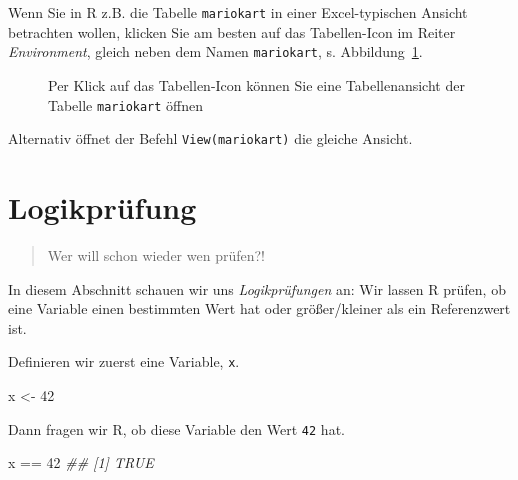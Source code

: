 \documentclass[
  a4paper,
  DIV=11]{scrreprt}
\newenvironment{Shaded}{\begin{snugshade}}{\end{snugshade}}
\newcommand{\DecValTok}[1]{\textcolor[rgb]{0.68,0.00,0.00}{#1}}
\newcommand{\DocumentationTok}[1]{\textcolor[rgb]{0.37,0.37,0.37}{\textit{#1}}}
\newcommand{\NormalTok}[1]{\textcolor[rgb]{0.00,0.23,0.31}{#1}}
\newcommand{\OtherTok}[1]{\textcolor[rgb]{0.00,0.23,0.31}{#1}}
\newcommand{\SpecialCharTok}[1]{\textcolor[rgb]{0.37,0.37,0.37}{#1}}
\theoremstyle{definition}
\theoremstyle{definition}
\theoremstyle{definition}
\theoremstyle{remark}
\begin{document}
Wenn Sie in R z.B. die Tabelle \texttt{mariokart} in einer
Excel-typischen Ansicht betrachten wollen, klicken Sie am besten auf das
Tabellen-Icon im Reiter \emph{Environment}, gleich neben dem Namen
\texttt{mariokart}, s. Abbildung~\ref{fig-view-mariokart}.

\begin{figure}


\caption{\label{fig-view-mariokart}Per Klick auf das Tabellen-Icon
können Sie eine Tabellenansicht der Tabelle \texttt{mariokart} öffnen}

\end{figure}%

Alternativ öffnet der Befehl \texttt{View(mariokart)} die gleiche
Ansicht.

\section{Logikprüfung}\label{sec-logic}

\begin{quote}
{} Wer will schon wieder wen prüfen?!
\end{quote}

In diesem Abschnitt schauen wir uns \emph{Logikprüfungen} an: Wir lassen
R prüfen, ob eine Variable einen bestimmten Wert hat oder größer/kleiner
als ein Referenzwert ist.

Definieren wir zuerst eine Variable, \texttt{x}.

\begin{Shaded}
\begin{Highlighting}[]
\NormalTok{x }\OtherTok{\textless{}{-}} \DecValTok{42}
\end{Highlighting}
\end{Shaded}

Dann fragen wir R, ob diese Variable den Wert \texttt{42} hat.

\begin{Shaded}
\begin{Highlighting}[]
\NormalTok{x }\SpecialCharTok{==} \DecValTok{42}
\DocumentationTok{\#\# [1] TRUE}
\end{Highlighting}
\end{Shaded}
\end{document}
